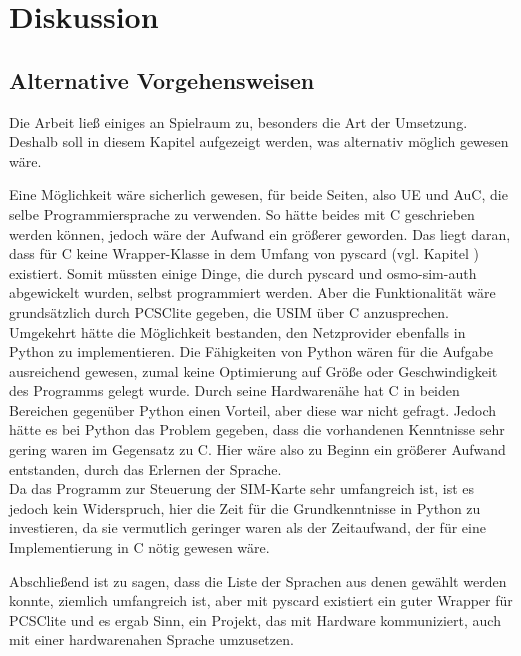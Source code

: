 \clearpage

\section[Diskussion (Heumann)]{Diskussion}
\label{diskussion}

	\subsection[Alternative Vorgehensweisen (Heumann)]{Alternative Vorgehensweisen}
	\label{diskussion-alternative}
	
	Die Arbeit ließ einiges an Spielraum zu, besonders die Art der Umsetzung. Deshalb soll in
	diesem Kapitel aufgezeigt werden, was alternativ möglich gewesen wäre.
	
	Eine Möglichkeit wäre sicherlich gewesen, für beide Seiten, also UE und AuC, die selbe
	Programmiersprache zu verwenden. So hätte beides mit C geschrieben werden können,
	jedoch wäre der Aufwand ein größerer geworden. Das liegt daran, dass für C keine
	Wrapper-Klasse in dem Umfang von pyscard (vgl. Kapitel ) existiert.
	Somit müssten einige Dinge, die durch pyscard und osmo-sim-auth abgewickelt wurden,
	selbst programmiert werden. Aber die Funktionalität wäre grundsätzlich durch PCSClite
	gegeben, die USIM über C anzusprechen. \\
	Umgekehrt hätte die Möglichkeit bestanden, den Netzprovider ebenfalls in Python zu
	implementieren. Die Fähigkeiten von Python wären für die Aufgabe ausreichend gewesen,
	zumal keine Optimierung auf Größe oder Geschwindigkeit des Programms gelegt wurde.
	Durch seine Hardwarenähe hat C in beiden Bereichen gegenüber Python einen Vorteil,
	aber diese war nicht gefragt. Jedoch hätte es bei Python das Problem gegeben, dass
	die vorhandenen Kenntnisse sehr gering waren im Gegensatz zu C. Hier wäre also zu Beginn
	ein größerer Aufwand entstanden, durch das Erlernen der Sprache. \\
	Da das Programm zur Steuerung der SIM-Karte sehr umfangreich ist, ist es jedoch kein Widerspruch,
	hier die Zeit für die Grundkenntnisse in Python zu investieren, da sie vermutlich geringer
	waren als der Zeitaufwand, der für eine Implementierung in C nötig gewesen wäre.
	
	Abschließend ist zu sagen, dass die Liste der Sprachen aus denen gewählt werden konnte,
	ziemlich umfangreich ist, aber mit pyscard existiert ein guter Wrapper für PCSClite und
	es ergab Sinn, ein Projekt, das mit Hardware kommuniziert, auch mit einer hardwarenahen
	Sprache umzusetzen.	
	
